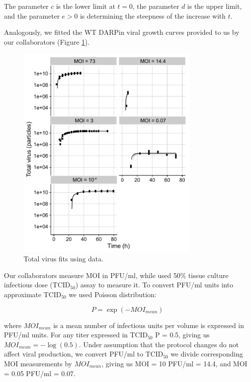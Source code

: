 The parameter $c$ is the lower limit at $t=0$, the parameter $d$ is the upper limit, and the parameter $e>0$ is determining the steepness of the increase with $t$.

Analogously, we fitted the WT DARPin viral growth curves provided to us by our collaborators \cite{DarpinData} (Figure \ref{figure:totalVirusFits}).

\begin{figure}
\begin{center}
\includegraphics[width=0.8\textwidth, trim={0cm 0cm 0cm 0cm}, clip]{D_chapters/3_DARPinModels/fittingTotalVirus.pdf}
\caption[Total virus fits]{Total virus fits using \cite{rudiger2019multiscale, DarpinData} data.}
\label{figure:totalVirusFits}
\end{center}
\end{figure}

Our collaborators measure MOI in PFU/ml, while \cite{rudiger2019multiscale} used 50\% tissue culture infectious dose (TCID$_50$) assay to measure it. To convert PFU/ml units into approximate TCID$_50$ we used Poisson distribution:

\begin{equation}
P = \exp(-MOI_{mean})
\end{equation}

where $MOI_{mean}$ is a mean number of infectious units per volume is expressed in PFU/ml units. For any titer expressed in TCID$_50$ P = 0.5, giving us $MOI_{mean} = -\log(0.5)$. Under assumption that the protocol changes do not affect viral production, we convert PFU/ml to TCID$_50$ we divide corresponding MOI measurements by $MOI_{mean}$, giving us MOI = 10 PFU/ml = 14.4, and MOI = 0.05 PFU/ml = 0.07.


